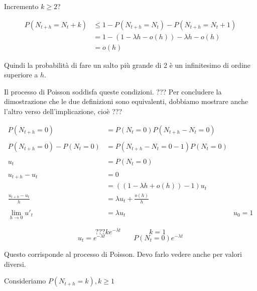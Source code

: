 \documentclass[a4paper,12pt]{book}
\begin{document}
Incremento $ k \ge 2 $?

\begin{align*}	
	P(N_{t+h} = N_t + k) & \le 1 - P(N_{t+h} = N_t) - P(N_{t+h} = N_t + 1) \\
	& = 1 - (1 - \lambda h - o(h)) - \lambda h - o(h) \\
	& = o(h)
\end{align*}

Quindi la probabilità di fare un salto più grande di 2 è un infinitesimo di ordine superiore a $ h $. 

Il processo di Poisson soddisfa queste condizioni. ??? %
Per concludere la dimostrazione che le due definizioni sono equivalenti, dobbiamo mostrare anche l'altro verso dell'implicazione, cioè ??? %

\begin{align*}
	P(N_{t+h} = 0) & = P(N_t = 0) P(N_{t+h} - N_t = 0) \\
	\\
	P(N_{t+h} = 0) - P(N_t = 0) & = P(N_{t+h} - N_t = 0 - 1 )P(N_t = 0) \\
	\\
	u_t & = P(N_t = 0) \\
	\\
	u_{t+h} - u_t & = 0 \\
	& = ((1 - \lambda h + o(h)) - 1 ) u_t \\
	\frac{u_{t+h} - u_t}{h} & = \lambda u_t + \frac{o(h)}{h} \\
	\\
	\lim\limits_{h \to 0} u'_t & = \lambda u_t & u_0 = 1
\end{align*}

$$ 	??? ke^{-\lambda t} \qquad \qquad k = 1$$
$$ u_t = e^{-\lambda t} \qquad \qquad P(N_t = 0) e^{-\lambda t} $$

Questo corrisponde al processo di Poisson. Devo farlo vedere anche per valori diversi.

Consideriamo $ P(N_{t+h} = k), k \ge 1 $









\backmatter
\end{document}

